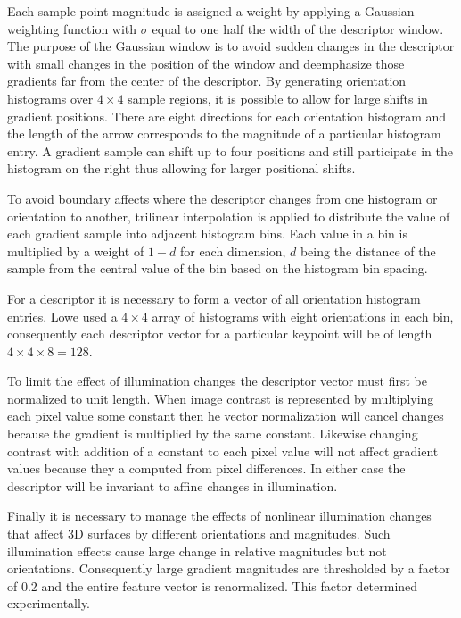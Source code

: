 \documentclass{article}
\begin{document}
Each sample point magnitude is assigned a weight by applying a Gaussian weighting function with $\sigma$ equal to one half the width of the descriptor window.  The purpose of the Gaussian window is to avoid sudden changes in the descriptor with small changes in the position of the window and deemphasize those gradients far from the center of the descriptor.  By generating orientation histograms over $4\times 4$ sample regions, it is possible to allow for large shifts in gradient positions.  
There are eight directions for each orientation histogram and the length of the arrow corresponds to the magnitude of a particular histogram entry.  A gradient sample can shift up to four positions and still participate in the histogram on the right thus allowing for larger positional shifts.

To avoid boundary affects where the descriptor changes from one histogram or orientation to another, trilinear interpolation is applied to distribute the value of each gradient sample into adjacent histogram bins.  
Each value in a bin is multiplied by a weight of $1-d$ for each dimension, $d$ being the distance of the sample from the central value of the bin based on the histogram bin spacing. 

For a descriptor it is necessary to form a vector of all orientation histogram entries.  
Lowe \cite{dLowe04} used a $4\times 4$ array of histograms with eight orientations in each bin, consequently each descriptor vector for a particular keypoint will be of length $4\times 4 \times 8 = 128$. 

To limit the effect of illumination changes the descriptor vector must first be normalized to unit length. 
When image contrast is represented by multiplying each pixel value some constant then he vector normalization will cancel changes because the gradient is multiplied by the same constant. Likewise changing contrast with addition of a constant to each pixel value will not affect gradient values because they a computed from pixel differences.  In either case the descriptor will be invariant to affine changes in illumination.

Finally it is necessary to manage the effects of nonlinear illumination changes that affect 3D surfaces by different orientations and magnitudes. Such illumination effects cause large change in relative magnitudes but not orientations.  Consequently large gradient magnitudes are thresholded by a factor of 0.2 and the entire feature vector is renormalized.  This factor determined experimentally. 
\end{document}
